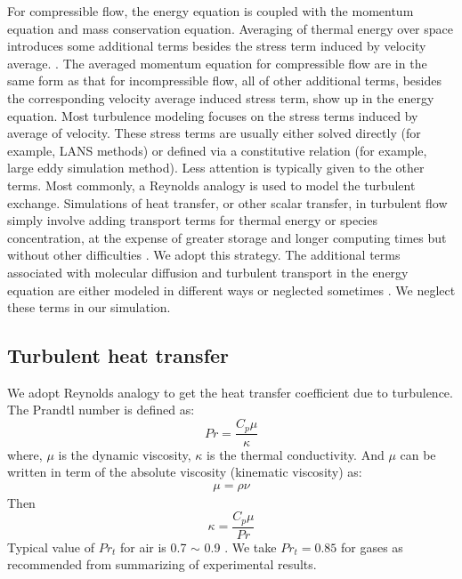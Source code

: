 For compressible flow, the energy equation is coupled with the momentum equation and mass conservation equation. Averaging of thermal energy over space introduces some additional terms besides the stress term induced by velocity average. \citep{NASACompressibleTurbulence}. The averaged momentum equation for compressible flow are in the same form as that for incompressible flow, all of other additional terms, besides the corresponding velocity average induced stress term, show up in the energy equation. Most turbulence modeling focuses on the stress terms induced by average of velocity. These stress terms are usually either solved directly (for example, LANS methods) or defined via a constitutive relation (for example, large eddy simulation method). Less attention is typically given to the other terms. Most commonly, a Reynolds analogy is used to model the turbulent exchange. Simulations of heat transfer, or other scalar transfer, in turbulent flow simply involve adding transport terms for thermal energy or species concentration, at the expense of greater storage and longer computing times but without other difficulties \citep{cebeci2013analysis}. We adopt this strategy. %
The additional terms associated with molecular diffusion and turbulent transport in the energy equation are either modeled in different ways or neglected sometimes \citep{NASACompressibleTurbulence}. We neglect these terms in our simulation.

\subsection{Turbulent heat transfer}
We adopt Reynolds analogy to get the heat transfer coefficient due to turbulence.
The Prandtl number is defined as:
\begin{equation}
Pr=\dfrac{C_p \mu}{\kappa}
\end{equation}
where, $\mu$ is the dynamic viscosity, $\kappa$ is the thermal conductivity. And $\mu$  can be written in term of the absolute viscosity (kinematic viscosity) as:
\begin{align}
\mu=\rho \nu
\end{align}
Then
\begin{equation}
\kappa=\dfrac{C_p \mu}{Pr}
\end{equation}
Typical value of $Pr_t$ for air is 0.7 $\sim$ 0.9 . We take $Pr_t=0.85$ for gases as recommended \citet{kays1994turbulent} from summarizing of experimental results. 

